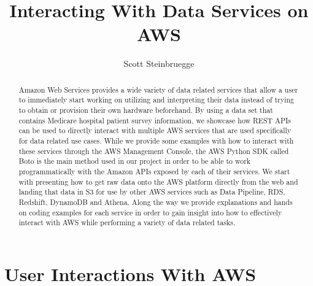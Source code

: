 
\title{Interacting With Data Services on AWS}

\author{Scott Steinbruegge}

\renewcommand{\shortauthors}{S. Steinbruegge}

\begin{abstract}
Amazon Web Services provides a wide variety of data related services that 
allow a user to immediately start working on utilizing and interpreting their 
data instead of trying to obtain or provision their own hardware beforehand. 
By using a data set that contains Medicare hospital patient survey 
information, we showcase how REST APIs can be used to directly interact with 
multiple AWS services that are used specifically for data related use cases. 
While we provide some examples with how to interact with these services 
through the AWS Management Console, the AWS Python SDK called Boto is the main 
method used in our project in order to be able to work programmatically with 
the Amazon APIs exposed by each of their services. We start with presenting 
how to get raw data onto the AWS platform directly from the web and landing 
that data in S3 for use by other AWS services such as Data Pipeline, RDS, 
Redshift, DynamoDB and Athena. Along the way we provide explanations and hands 
on coding examples for each service in order to gain insight into how to 
effectively interact with AWS while performing a variety of data related 
tasks. 
\end{abstract}


\maketitle

\section{User Interactions With AWS}

